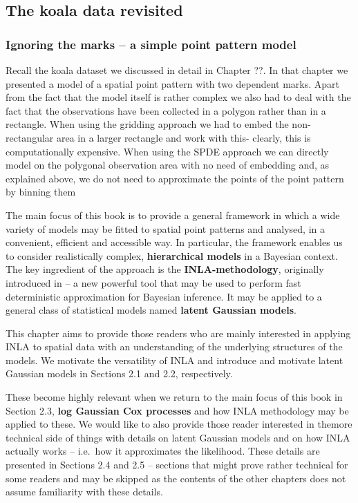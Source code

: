 \subsection{The koala data revisited}\label{koala2}
\subsubsection{Ignoring the marks -- a simple point pattern model }
Recall the koala dataset we discussed in detail in Chapter ??. In that chapter we presented a model of a spatial point pattern with two dependent marks. Apart from the fact that the model itself is rather complex we also had to deal with the fact that the observations have been collected in a polygon rather than in a rectangle. When using the gridding approach we had to embed the non-rectangular area in a larger rectangle and work with this- clearly, this is computationally expensive. When using the SPDE approach we can directly model on the polygonal observation area with no need of embedding and, as explained above, we do not need to approximate the points of the point pattern by binning them

The main focus of this book is to provide a general framework in which a wide variety of models may be fitted to spatial point patterns and analysed, in a convenient, efficient and accessible way. In particular, the framework enables us to consider realistically complex, \textbf{hierarchical models} in a Bayesian context. The key ingredient of the approach is the \textbf{INLA-methodology}, originally introduced in \cite{rueal:09} -- a new powerful tool that may be used to perform fast deterministic approximation for Bayesian inference. It may be applied to a general class of statistical models named \textbf{latent Gaussian models}.

This chapter aims to provide those readers who are mainly interested in applying INLA to spatial data with an understanding of the underlying structures of the models. We motivate the versatility of INLA and introduce and motivate latent Gaussian models in Sections 2.1 and 2.2, respectively.  


These become highly relevant when we return to the main focus of this book in Section 2.3, \textbf{log Gaussian Cox processes} and how INLA methodology may be applied to these.
We would like to also provide those reader interested in themore  technical side of things with details on latent Gaussian models and on how INLA actually works --  i.e.\ how it approximates the likelihood. These details are presented in Sections 2.4 and  2.5 -- sections that might prove rather technical for some readers and may be skipped as the contents of the other chapters does not assume familiarity with these details. 

